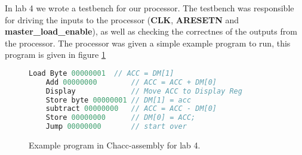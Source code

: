 In lab 4 we wrote a testbench for our processor. The testbench was responsible
for driving the inputs to the processor (\textbf{CLK}, \textbf{ARESETN} and
\textbf{master\_load\_enable}), as well as checking the correctnes of the
outputs from the processor. The processor was given a simple example program to
run, this program is given in figure \ref{code:lab4}

\begin{figure}
    \caption{Example program in Chacc-assembly for lab 4.}
    \label{code:lab4}
    \centering
    \begin{lstlisting}[language=c]
    Load Byte 00000001  // ACC = DM[1]
    Add 00000000        // ACC = ACC + DM[0]
    Display             // Move ACC to Display Reg
    Store byte 00000001 // DM[1] = acc
    subtract 00000000   // ACC = ACC - DM[0]
    Store 00000000      // DM[0] = ACC;
    Jump 00000000       // start over
    \end{lstlisting}
\end{figure}
